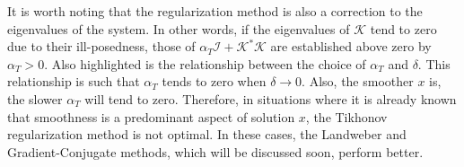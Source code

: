 			It is worth noting that the regularization method is also a correction to the eigenvalues of the system. In other words, if the eigenvalues of $\mathcal{K}$ tend to zero due to their ill-posedness, those of $\alpha_{T}\mathcal{I} + \mathcal{K}^*\mathcal{K}$ are established above zero by $\alpha_T>0$. Also highlighted is the relationship between the choice of $\alpha_T$ and $\delta$. This relationship is such that $\alpha_T$ tends to zero when $\delta\rightarrow0$. Also, the smoother $x$ is, the slower $\alpha_T$ will tend to zero. Therefore, in situations where it is already known that smoothness is a predominant aspect of solution $x$, the Tikhonov regularization method is not optimal. In these cases, the Landweber and Gradient-Conjugate methods, which will be discussed soon, perform better.
			
